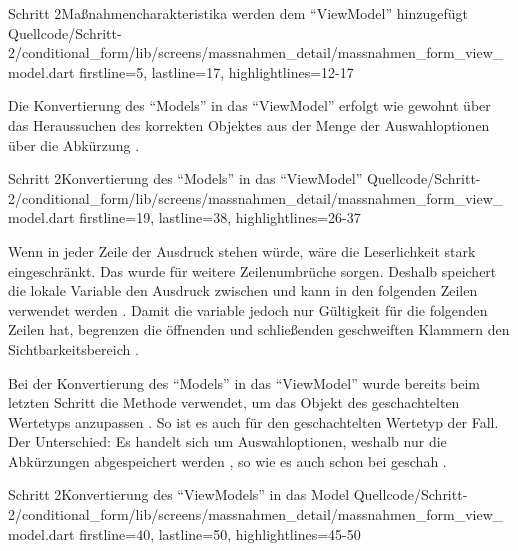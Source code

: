 \begin{alexlisting}{Schritt 2}{Maßnahmencharakteristika werden dem \enquote{ViewModel} hinzugefügt}
  {Quellcode/Schritt-2/conditional_form/lib/screens/massnahmen_detail/massnahmen_form_view_model.dart}
  {firstline=5, lastline=17, highlightlines={12-17}}
  \label{lst:Schritt2MassnahmencharakteristikaWerdenDemViewModelHinzugefuegt}
\end{alexlisting}


Die Konvertierung des \enquote{Models} in das \enquote{ViewModel} erfolgt wie gewohnt über das Heraussuchen des korrekten Objektes aus der Menge der Auswahloptionen über die Abkürzung .

\begin{alexlisting}{Schritt 2}{Konvertierung des \enquote{Models} in das \enquote{ViewModel}}
  {Quellcode/Schritt-2/conditional_form/lib/screens/massnahmen_detail/massnahmen_form_view_model.dart}
  {firstline=19, lastline=38, highlightlines={26-37}}
  \label{lst:Schritt2KonvertierungDesModelsInDasViewModel}
\end{alexlisting}

Wenn in jeder Zeile der Ausdruck  stehen würde, wäre die Leserlichkeit stark eingeschränkt. Das wurde für weitere Zeilenumbrüche sorgen. Deshalb speichert die lokale Variable  den Ausdruck zwischen und kann in den folgenden Zeilen verwendet werden .
Damit die variable  jedoch nur Gültigkeit für die folgenden Zeilen hat, begrenzen die öffnenden und schließenden geschweiften Klammern den Sichtbarkeitsbereich .

Bei der Konvertierung des \enquote{Models} in das \enquote{ViewModel} wurde bereits beim letzten Schritt die Methode  verwendet, um das Objekt des geschachtelten Wertetyps  anzupassen . So ist es auch für den geschachtelten Wertetyp  der Fall. Der Unterschied: Es handelt sich um Auswahloptionen, weshalb nur die Abkürzungen abgespeichert werden , so wie es auch schon bei  geschah .

\begin{alexlisting}{Schritt 2}{Konvertierung des \enquote{ViewModels} in das Model}
  {Quellcode/Schritt-2/conditional_form/lib/screens/massnahmen_detail/massnahmen_form_view_model.dart}
  {firstline=40, lastline=50, highlightlines={45-50}}
  \label{lst:Schritt2KonvertierungDesViewModelsInDasModel}
\end{alexlisting}

